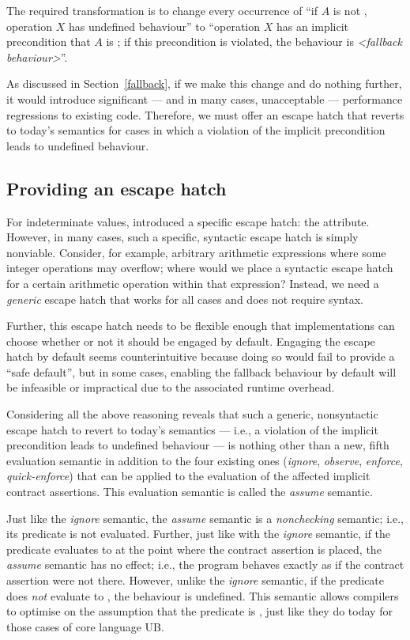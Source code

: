 The required transformation is to change every occurrence of “if $A$ is not , operation $X$ has undefined behaviour'' to ``operation $X$ has an implicit precondition that $A$ is ; if this precondition is violated, the behaviour is \emph{<fallback behaviour>}''.

As discussed in Section~\ref{fallback}, if we make this change and do nothing further, it would introduce significant --- and in many cases, unacceptable --- performance regressions to existing code. Therefore, we must offer an escape hatch that reverts to today's semantics for cases in which a violation of the implicit precondition leads to undefined behaviour.

\subsection{Providing an escape hatch}
\label{assume}

For indeterminate values, \cite{P2795R5} introduced a specific escape hatch: the \tcode{[[indeterminate]]} attribute. However, in many cases, such a specific, syntactic escape hatch is simply nonviable. Consider, for example, arbitrary arithmetic expressions where some integer operations may overflow; where would we place a syntactic escape hatch for a certain arithmetic operation within that expression? Instead, we need a \emph{generic} escape hatch that works for all cases and does not require syntax.

Further, this escape hatch needs to be flexible enough that implementations can choose whether or not it should be engaged by default. Engaging the escape hatch by default seems counterintuitive because doing so would fail to provide a ``safe default'', but in some cases, enabling the fallback behaviour by default will be infeasible or impractical due to the associated runtime overhead.

Considering all the above reasoning reveals that such a generic, nonsyntactic escape hatch to revert to today's semantics --- i.e., a violation of the implicit precondition leads to undefined behaviour --- is nothing other than a new, fifth evaluation semantic in addition to the four existing ones (\emph{ignore}, \emph{observe}, \emph{enforce}, \emph{quick-enforce}) that can be applied to the evaluation of the affected implicit contract assertions. This evaluation semantic is called the \emph{assume} semantic.

Just like the \emph{ignore} semantic, the \emph{assume} semantic is a \emph{nonchecking} semantic; i.e., its predicate is not evaluated. Further, just like with the \emph{ignore} semantic, if the predicate evaluates to  at the point where the contract assertion is placed, the \emph{assume} semantic has no effect; i.e., the program behaves exactly as if the contract assertion were not there. However, unlike the \emph{ignore} semantic, if the predicate does \emph{not} evaluate to , the behaviour is undefined. This semantic allows compilers to optimise on the assumption that the predicate is , just like they do today for those cases of core language UB.

